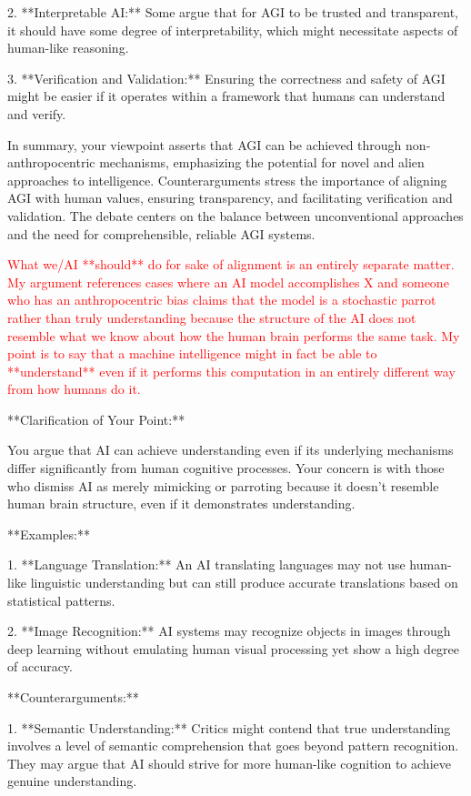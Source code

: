 \documentclass{article}
\begin{document}
2. **Interpretable AI:** Some argue that for AGI to be trusted and transparent, it should have some degree of interpretability, which might necessitate aspects of human-like reasoning.

3. **Verification and Validation:** Ensuring the correctness and safety of AGI might be easier if it operates within a framework that humans can understand and verify.

In summary, your viewpoint asserts that AGI can be achieved through non-anthropocentric mechanisms, emphasizing the potential for novel and alien approaches to intelligence. Counterarguments stress the importance of aligning AGI with human values, ensuring transparency, and facilitating verification and validation. The debate centers on the balance between unconventional approaches and the need for comprehensible, reliable AGI systems.

\textcolor{red}{What we/AI **should** do for sake of alignment is an entirely separate matter. My argument references cases where an AI model accomplishes X and someone who has an anthropocentric bias claims that the model is a stochastic parrot rather than truly understanding because the structure of the AI does not resemble what we know about how the human brain performs the same task. My point is to say that a machine intelligence might in fact be able to **understand** even if it performs this computation in an entirely different way from how humans do it.}

**Clarification of Your Point:**

You argue that AI can achieve understanding even if its underlying mechanisms differ significantly from human cognitive processes. Your concern is with those who dismiss AI as merely mimicking or parroting because it doesn't resemble human brain structure, even if it demonstrates understanding.

**Examples:**

1. **Language Translation:** An AI translating languages may not use human-like linguistic understanding but can still produce accurate translations based on statistical patterns.

2. **Image Recognition:** AI systems may recognize objects in images through deep learning without emulating human visual processing yet show a high degree of accuracy.

**Counterarguments:**

1. **Semantic Understanding:** Critics might contend that true understanding involves a level of semantic comprehension that goes beyond pattern recognition. They may argue that AI should strive for more human-like cognition to achieve genuine understanding.
\end{document}
